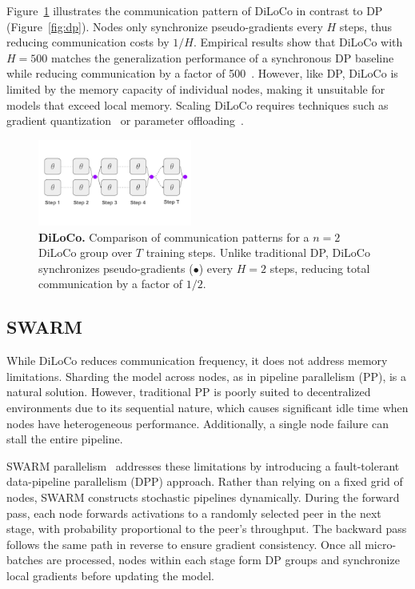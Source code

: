 \documentclass{article}
\newcommand{\purplecircle}{\textcolor{ppurple}{\LARGE$\bullet$}}
\begin{document}
Figure~\ref{fig:diloco} illustrates the communication pattern of DiLoCo in contrast to DP (Figure~\ref{fig:dp}). Nodes only synchronize pseudo-gradients every $H$ steps, thus reducing communication costs by $1/H$. Empirical results show that DiLoCo with $H=500$ matches the generalization performance of a synchronous DP baseline while reducing communication by a factor of 500~\cite{douillard2023diloco,jaghouar2024opendiloco}. However, like DP, DiLoCo is limited by the memory capacity of individual nodes, making it unsuitable for models that exceed local memory. Scaling DiLoCo requires techniques such as gradient quantization~\cite{jaghouar2024intellect1} or parameter offloading~\cite{cui2016}.

\begin{figure}[ht]
    \centering
    \vspace{0.5cm}
    \includegraphics[width=0.45\textwidth]{figures/diloco.pdf}
    \caption{\textbf{DiLoCo.} Comparison of communication patterns for a $n=2$ DiLoCo group over $T$ training steps. Unlike traditional DP, DiLoCo synchronizes pseudo-gradients (\purplecircle) every $H=2$ steps, reducing total communication by a factor of $1/2$.}
    \label{fig:diloco}
\end{figure}

\subsection{SWARM}

While DiLoCo reduces communication frequency, it does not address memory limitations. Sharding the model across nodes, as in pipeline parallelism (PP), is a natural solution. However, traditional PP is poorly suited to decentralized environments due to its sequential nature, which causes significant idle time when nodes have heterogeneous performance. Additionally, a single node failure can stall the entire pipeline.

SWARM parallelism~\cite{ryabinin2023swarm} addresses these limitations by introducing a fault-tolerant data-pipeline parallelism (DPP) approach. Rather than relying on a fixed grid of nodes, SWARM constructs stochastic pipelines dynamically. During the forward pass, each node forwards activations to a randomly selected peer in the next stage, with probability proportional to the peer's throughput. The backward pass follows the same path in reverse to ensure gradient consistency. Once all micro-batches are processed, nodes within each stage form DP groups and synchronize local gradients before updating the model.
\end{document}
